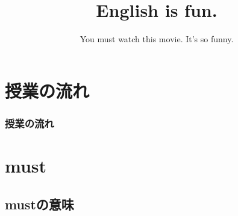 \documentclass[aspectratio=169,xcolor={dvipsnames,table}]{beamer}
\title{English is fun.}
\subtitle{You must watch this movie. It's so funny.}
\author{}
\institute[]{}
\date[]
\begin{document}
\begin{frame}[plain]
  \titlepage
\end{frame}

\section*{授業の流れ}
\begin{frame}[plain]
  \frametitle{授業の流れ}
  \tableofcontents
\end{frame}

\section{must}
\subsection{mustの意味}
\end{document}
